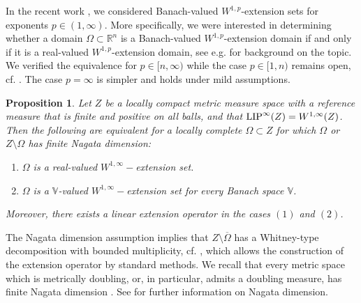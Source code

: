 \documentclass[reqno]{amsart}
\newcommand{\LIP}{{\rm LIP}}
\numberwithin{equation}{section}
\newtheorem{proposition}[theorem]{Proposition}
\theoremstyle{remark}
\begin{document}
In the recent work \cite{Garc:Iko:Zhu:23}, we considered Banach-valued $W^{1,p}$-extension sets for exponents $p \in (1,\infty)$. More specifically, we were interested in determining whether a domain $\Omega \subset \mathbb{R}^n$ is a Banach-valued $W^{1,p}$-extension domain if and only if it is a real-valued $W^{1,p}$-extension domain, see e.g. \cite{Kos:99,Bjo:Sha:07,HKT2008:B} for background on the topic. We verified the equivalence for $p \in [n,\infty)$ while the case $p \in [1,n)$ remains open, cf. \cite[Question 1.1]{Garc:Iko:Zhu:23}. The case $p = \infty$ is simpler and holds under mild assumptions.
\begin{proposition}\label{prop:Banach-valued_version}
Let $Z$ be a locally compact metric measure space with a reference measure that is finite and positive on all balls, and that $\LIP^{\infty}(Z) = W^{1,\infty}(Z)$. Then the following are equivalent for a locally complete $\Omega \subset Z$ for which $\Omega$ or $Z \setminus \Omega$ has finite Nagata dimension:
\begin{enumerate}
 \item $\Omega$ is a real-valued $W^{1,\infty}-$extension set.
 \item $\Omega$ is a $\mathbb V$-valued $W^{1,\infty}-$extension set for every Banach space $\mathbb{V}$.
 \end{enumerate}
Moreover, there exists a linear extension operator in the cases $(1)$ and $(2)$.
\end{proposition}
The Nagata dimension assumption implies that $Z \setminus \overline{\Omega}$ has a Whitney-type decomposition with bounded multiplicity, cf. \cite[Section 5]{La:Sch:05}, which allows the construction of the extension operator by standard methods. We recall that every metric space which is metrically doubling, or, in particular, admits a doubling measure, has finite Nagata dimension \cite[Lemma 2.3]{La:Sch:05}. See \cite{La:Sch:05} for further information on Nagata dimension.
\end{document}
